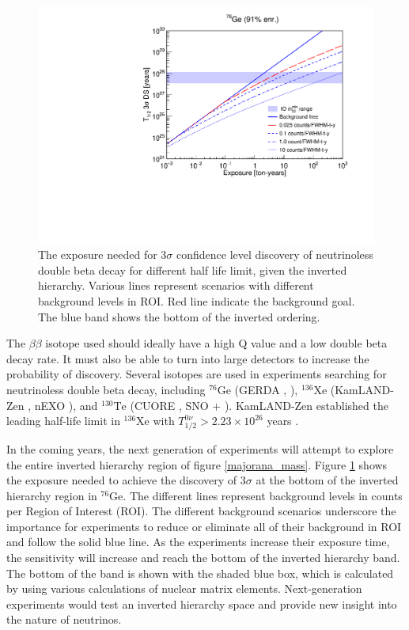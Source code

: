 \begin{figure}[!htb]
\centering
\includegraphics[width=0.99\linewidth]{ch1/figs/ThreeSigDL.pdf}
\caption{The exposure needed for 3$\sigma$ confidence level discovery of neutrinoless double beta decay for different half life limit, given the inverted hierarchy. Various lines represent scenarios with different background levels in ROI. Red line indicate the {\Lthou} background goal. The blue band shows the bottom of the inverted ordering.}
\label{exposure_plot}
\end{figure}

The $\beta\beta$ isotope used should ideally have a high Q value and a low double beta decay rate. It must also be able to turn into large detectors to increase the probability of discovery. Several isotopes are used in experiments searching for neutrinoless double beta decay, including ${}^{76}\mathrm{Ge}$ (GERDA \cite{GERDA_final}, {\MJD} \cite{Majorana_final}), ${}^{136}\mathrm{Xe}$ (KamLAND-Zen \cite{KamLAND-Zen:2024eml}, nEXO \cite{nEXO:2021ujk}), and ${}^{130}\mathrm{Te}$ (CUORE \cite{Arnaboldi2002du}, SNO $+$ \cite{SNO_paper}). KamLAND-Zen established the leading half-life limit in $^{136}$Xe with $T^{0\nu}_{1/2} > 2.23 \times 10^{26}$ years \cite{KamLAND-Zen:2024eml}. 


In the coming years, the next generation of experiments will attempt to explore the entire inverted hierarchy region of figure \ref{majorana_mass}. Figure \ref{exposure_plot} shows the exposure needed to achieve the discovery of $3\sigma$ at the bottom of the inverted hierarchy region in ${}^{76}\mathrm{Ge}$. The different lines represent background levels in counts per Region of Interest (ROI). The different background scenarios underscore the importance for experiments to reduce or eliminate all of their background in ROI and follow the solid blue line. As the experiments increase their exposure time, the sensitivity will increase and reach the bottom of the inverted hierarchy band. The bottom of the band is shown with the shaded blue box, which is calculated by using various calculations of nuclear matrix elements. Next-generation experiments would test an inverted hierarchy space and provide new insight into the nature of neutrinos.

